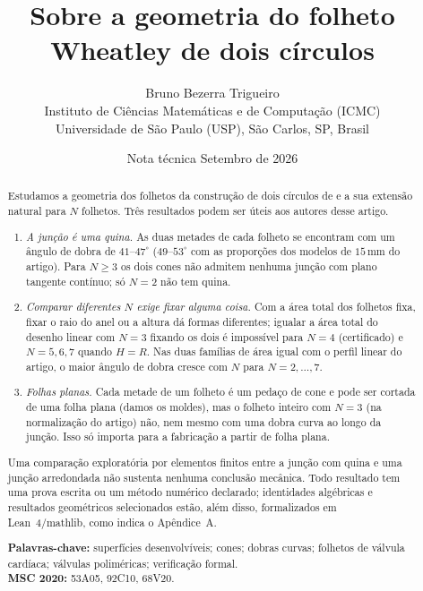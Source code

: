 \documentclass[11pt,a4paper]{article}
\title{\bfseries Sobre a geometria do folheto Wheatley de dois círculos}
\author{Bruno Bezerra Trigueiro\\[2pt]
  \small Instituto de Ciências Matemáticas e de Computação (ICMC)\\
  \small Universidade de São Paulo (USP), São Carlos, SP, Brasil}
\date{Nota técnica \quad Setembro de 2026}
\theoremstyle{plain}
\theoremstyle{remark}
\begin{document}
\maketitle
\thispagestyle{fancy}

\begin{abstract}
\noindent Estudamos a geometria dos folhetos da construção de dois círculos de \citet{McKee2026} e a sua extensão natural
para $N$ folhetos. Três resultados podem ser úteis aos autores desse artigo.
\begin{enumerate}[label=(\roman*),leftmargin=2em]
\item \emph{A junção é uma quina.} As duas metades de cada folheto se encontram com um ângulo de dobra de $41$--$47^\circ$
  ($49$--$53^\circ$ com as proporções dos modelos de $15$\,mm do artigo). Para $N\ge3$ os dois cones não admitem nenhuma
  junção com plano tangente contínuo; só $N=2$ não tem quina.
\item \emph{Comparar diferentes $N$ exige fixar alguma coisa.} Com a área total dos folhetos fixa, fixar o raio do anel ou a
  altura dá formas diferentes; igualar a área total do desenho linear com $N=3$ fixando os dois é impossível para $N=4$
  (certificado) e $N=5,6,7$ quando $H=R$. Nas duas famílias de área igual com o perfil linear do artigo, o maior ângulo de
  dobra cresce com $N$ para $N=2,\dots,7$.
\item \emph{Folhas planas.} Cada metade de um folheto é um pedaço de cone e pode ser cortada de uma folha plana (damos os
  moldes), mas o folheto inteiro com $N=3$ (na normalização do artigo) não, nem mesmo com uma dobra curva ao longo da
  junção. Isso só importa para a fabricação a partir de folha plana.
\end{enumerate}
Uma comparação exploratória por elementos finitos entre a junção com quina e uma junção arredondada não sustenta nenhuma
conclusão mecânica. Todo resultado tem uma prova escrita ou um método numérico declarado; identidades algébricas e resultados
geométricos selecionados estão, além disso, formalizados em Lean~4/mathlib, como indica o Apêndice~A.

\medskip\noindent\textbf{Palavras-chave:} superfícies desenvolvíveis; cones; dobras curvas; folhetos de válvula cardíaca;
válvulas poliméricas; verificação formal.\\
\textbf{MSC 2020:} 53A05, 92C10, 68V20.
\end{abstract}

\tableofcontents

\end{document}
